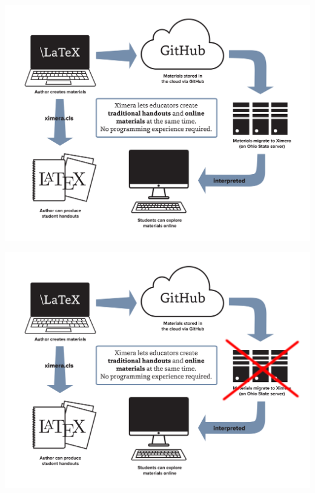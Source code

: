 \documentclass[aspectratio=169,14pt]{beamer}
\begin{document}
\begin{frame}
  \begin{center}
    \includegraphics[height=\textheight]{XimeraGraphic.png}
  \end{center}
\end{frame}

\begin{frame}
  \begin{center}
    \includegraphics[height=\textheight]{XimeraGraphicCROSS-OUT.png}
  \end{center}
\end{frame}
\end{document}
